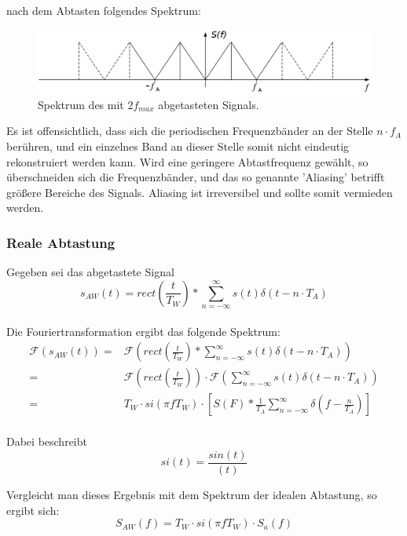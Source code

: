 nach dem Abtasten folgendes Spektrum:

\begin{figure}[h!]
\centering
\includegraphics[scale=0.3]{images/2f.png}
\caption{Spektrum des mit $2f_{max}$ abgetasteten Signals.}
\label{2fsig}
\end{figure}
\newpage

Es ist offensichtlich, dass sich die periodischen Frequenzbänder an der Stelle $n \cdot f_A$ berühren, und ein einzelnes Band an dieser Stelle somit nicht eindeutig rekonstruiert werden kann. Wird eine geringere Abtastfrequenz gewählt, so überschneiden sich die Frequenzbänder, und das so genannte 'Aliasing' betrifft größere Bereiche des Signals. Aliasing ist irreversibel und sollte somit vermieden werden.

\subsubsection{Reale Abtastung}

Gegeben sei das abgetastete Signal\\
$$s_{AW}(t) = rect\left(\frac{t}{T_W}\right) * \sum_{n=-\infty}^{\infty} s(t) \delta (t - n\cdot T_A)$$\\
Die Fouriertransformation ergibt das folgende Spektrum:\\
\begin{equation}
\begin{aligned}
\mathcal{F}(s_{AW}(t)) = &  \mathcal{F}(rect\left(\frac{t}{T_W}\right) * \sum_{n=-\infty}^{\infty} s(t) \delta (t - n\cdot T_A)) \\
= & \mathcal{F}(rect\left(\frac{t}{T_W}\right)) \cdot \mathcal{F}(\sum_{n=-\infty}^{\infty} s(t) \delta (t - n\cdot T_A)) \\
= & T_W \cdot si(\pi f T_W) \cdot \left[ S(F) * \frac{1}{T_A} 
\sum_{n=-\infty}^{\infty} \delta \left(f - \frac{n}{T_A}\right) \right] \\
\end{aligned}
\end{equation}

Dabei beschreibt $$si(t) = \frac{sin(t)}{(t)}$$

Vergleicht man dieses Ergebnis mit dem Spektrum der idealen Abtastung, so ergibt sich:
$$S_{AW}(f) = T_W \cdot si(\pi f T_W) \cdot S_{a}(f)$$

